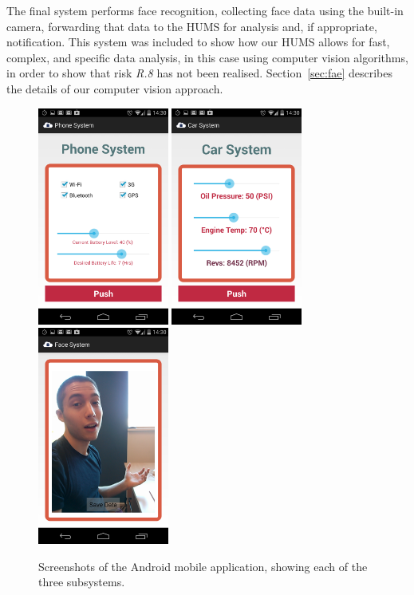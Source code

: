 \documentclass[10pt,a4paper]{article}
\begin{document}
The final system performs face recognition, collecting face data using the built-in camera, forwarding that data to the HUMS for analysis and, if appropriate, notification. This system was included to show how our HUMS allows for fast, complex, and specific data analysis, in this case using computer vision algorithms, in order to show that risk \emph{R.8} has not been realised. Section~\ref{sec:fae} describes the details of our computer vision approach.

\begin{figure}[tbp]
\centering
\includegraphics[width=4.3cm]{images/phoneApp.png}
\hspace{0.5cm}
\includegraphics[width=4.3cm]{images/carApp.png}
\hspace{0.5cm}
\includegraphics[width=4.3cm]{images/faceApp.png}
\caption{Screenshots of the Android mobile application, showing each of the three subsystems.}
\label{fig:android}
\end{figure}
\end{document}
